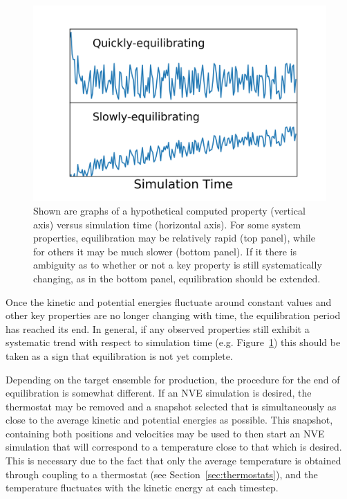 \documentclass[9pt,bestpractices]{livecoms}
\begin{document}
\begin{figure}[h]
\centering
\includegraphics[width=\linewidth]{Equilibration_fig.png}
\caption{Shown are graphs of a hypothetical computed property (vertical axis) versus simulation time (horizontal axis). For some system properties, equilibration may be relatively rapid (top panel), while for others it may be much slower (bottom panel). If it there is ambiguity as to whether or not a key property is still systematically changing, as in the bottom panel, equilibration should be extended.}
\label{equilibration}
\end{figure}

Once the kinetic and potential energies fluctuate around constant values and other key properties are no longer changing with time, the equilibration period has reached its end.
In general, if any observed properties still exhibit a systematic trend with respect to simulation time (e.g. Figure~\ref{equilibration}) this should be taken as a sign that equilibration is not yet complete.

Depending on the target ensemble for production, the procedure for the end of equilibration is somewhat different.
If an NVE simulation is desired, the thermostat may be removed and a snapshot selected that is simultaneously as close to the average kinetic and potential energies as possible.
This snapshot, containing both positions and velocities may be used to then start an NVE simulation that will correspond to a temperature close to that which is desired.
This is necessary due to the fact that only the average temperature is obtained through coupling to a thermostat (see Section~\ref{sec:thermostats}), and the temperature fluctuates with the kinetic energy at each timestep.
\end{document}
